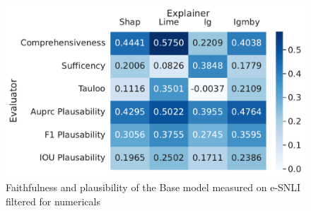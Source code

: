 \begin{figure}[h!]
    \centering
    \includegraphics[width=\textwidth]{./images/ferret_heatmaps_phenomena/default_mnli/numericals.pdf}
    \caption{Faithfulness and plausibility of the Base model measured on \acs{e-SNLI} filtered for numericals}
    \label{fig:ferret-mnli-numericals}
\end{figure}
